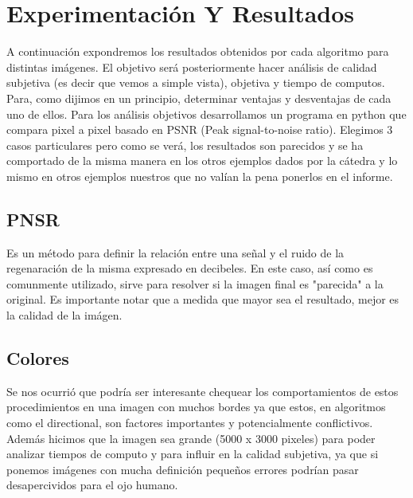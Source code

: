 \section{Experimentación Y Resultados}

A continuación expondremos los resultados obtenidos por cada algoritmo para distintas imágenes. El objetivo será posteriormente hacer análisis de calidad subjetiva (es decir que vemos a simple vista), objetiva y tiempo de computos. Para, como dijimos en un principio, determinar ventajas y desventajas de cada uno de ellos. Para los análisis objetivos desarrollamos un programa en python que compara pixel a pixel basado en PSNR (Peak signal-to-noise ratio). Elegimos 3 casos particulares pero como se verá, los resultados son parecidos y se ha comportado de la misma manera en los otros ejemplos dados por la cátedra y lo mismo en otros ejemplos nuestros que no valían la pena ponerlos en el informe.

\subsection{PNSR}
Es un método para definir la relación entre una señal y el ruido de la regenaración de la misma expresado en decibeles. En este caso, así como es comunmente utilizado, sirve para resolver si la imagen final es "parecida" a la original. Es importante notar que a medida que mayor sea el resultado, mejor es la calidad de la imágen.

\subsection{Colores}


Se nos ocurrió que podría ser interesante chequear los comportamientos de estos procedimientos en una imagen con muchos bordes ya que estos, en algoritmos como el directional, son factores importantes y potencialmente conflictivos. Además hicimos que la imagen sea grande (5000 x 3000 pixeles) para poder analizar tiempos de computo y para influir en la calidad subjetiva, ya que si ponemos imágenes con mucha definición pequeños errores podrían pasar desapercividos para el ojo humano.

